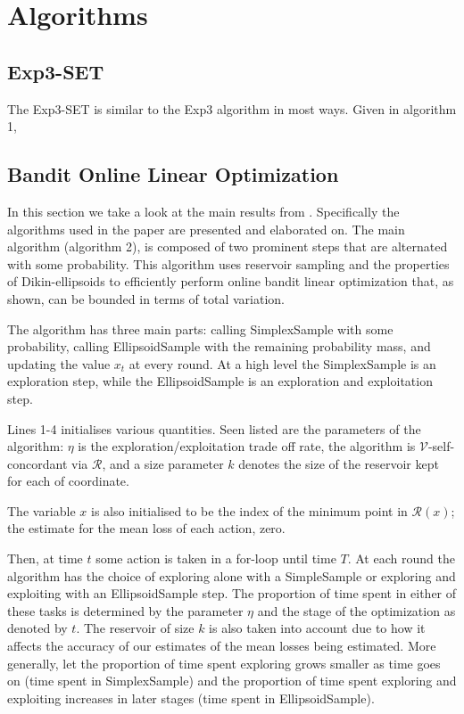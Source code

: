 \section{Algorithms}

\subsection{Exp3-SET}
The Exp3-SET is similar to the Exp3 algorithm in most ways. Given in algorithm 1, 


\unskip

\subsection{Bandit Online Linear Optimization}
In this section we take a look at the main results from \citep{hazan}.
Specifically  the algorithms used in the paper are presented and elaborated on.
The main algorithm (algorithm 2), is composed of two prominent steps that are alternated with 
some probability. This algorithm uses reservoir sampling and the 
properties of Dikin-ellipsoids to efficiently perform online bandit linear
optimization that, as shown, can be bounded in terms of total variation.

The algorithm has three main parts: calling SimplexSample with some probability, calling EllipsoidSample with the remaining probability mass, and updating the value $x_t$ at every round. At a high level the SimplexSample is an exploration step, while the EllipsoidSample is an exploration and exploitation step.

Lines 1-4 initialises various quantities. Seen listed are the parameters of the algorithm: $\eta$ is the exploration/exploitation trade off rate, the algorithm is $\mathcal{V}$-self-concordant via $\mathcal{R}$, and a size parameter $k$ denotes the size of the reservoir kept for each of coordinate. 


\unskip

\unskip

\unskip

The variable $x$ is also initialised to be the index of the minimum point in $\mathcal{R}(x)$; the estimate for the mean loss of each action, zero.

Then, at time $t$ some action is taken in a for-loop until time $T$. At each round the algorithm has the choice of exploring alone with a SimpleSample or exploring and exploiting with an EllipsoidSample step. The proportion of time spent in either of these tasks is determined by the parameter $\eta$ and the stage of the optimization as denoted by $t$. The reservoir of size $k$ is also taken into account due to how it affects the accuracy of our estimates of the mean losses being estimated. More generally, let the proportion of time spent exploring grows smaller as time goes on (time spent in SimplexSample) and the proportion of time spent exploring and exploiting increases in later stages (time spent in EllipsoidSample).

